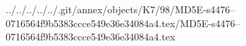 ../../../../../.git/annex/objects/K7/98/MD5E-s4476--0716564f9b5383ccce549e36e34084a4.tex/MD5E-s4476--0716564f9b5383ccce549e36e34084a4.tex